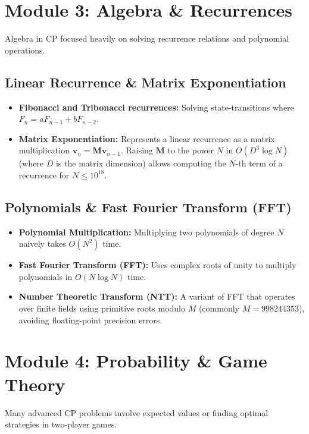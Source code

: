 \documentclass[10pt,journal,compsoc,onecolumn]{IEEEtran}
\begin{document}
\section{Module 3: Algebra \& Recurrences}
\label{sec:algebra}

Algebra in CP focused heavily on solving recurrence relations and polynomial operations.

\subsection{Linear Recurrence \& Matrix Exponentiation}
\begin{itemize}
    \item \textbf{Fibonacci and Tribonacci recurrences:} Solving state-transitions where $F_n = a F_{n-1} + b F_{n-2}$.
    \item \textbf{Matrix Exponentiation:} Represents a linear recurrence as a matrix multiplication $\mathbf{v}_n = \mathbf{M} \mathbf{v}_{n-1}$. Raising $\mathbf{M}$ to the power $N$ in $O(D^3 \log N)$ (where $D$ is the matrix dimension) allows computing the $N$-th term of a recurrence for $N \leq 10^{18}$.
\end{itemize}

\subsection{Polynomials \& Fast Fourier Transform (FFT)}
\begin{itemize}
    \item \textbf{Polynomial Multiplication:} Multiplying two polynomials of degree $N$ naively takes $O(N^2)$ time.
    \item \textbf{Fast Fourier Transform (FFT):} Uses complex roots of unity to multiply polynomials in $O(N \log N)$ time.
    \item \textbf{Number Theoretic Transform (NTT):} A variant of FFT that operates over finite fields using primitive roots modulo $M$ (commonly $M=998244353$), avoiding floating-point precision errors.
\end{itemize}

\section{Module 4: Probability \& Game Theory}
\label{sec:probability_game_theory}

Many advanced CP problems involve expected values or finding optimal strategies in two-player games.
\end{document}
